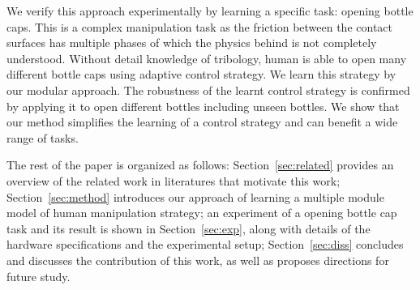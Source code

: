 We verify this approach experimentally by learning a specific task: opening bottle caps. This is a complex manipulation task as the friction between the contact surfaces has multiple phases of which the physics behind is not completely understood. Without detail knowledge of tribology, human is able to open many different bottle caps using adaptive control strategy. We learn this strategy by our modular approach. The robustness of the learnt control strategy is confirmed by applying it to open different bottles including unseen bottles. We show that our method simplifies the learning of a control strategy and can benefit a wide range of tasks.


The rest of the paper is organized as follows: Section~\ref{sec:related} provides an overview of the related work in literatures that motivate this work; Section~\ref{sec:method} introduces our approach of learning a multiple module model of human manipulation strategy; an experiment of a opening bottle cap task and its result is shown in Section~\ref{sec:exp}, along with details of the hardware specifications and the experimental setup; Section~\ref{sec:diss} concludes and discusses the contribution of this work, as well as proposes directions for future study.